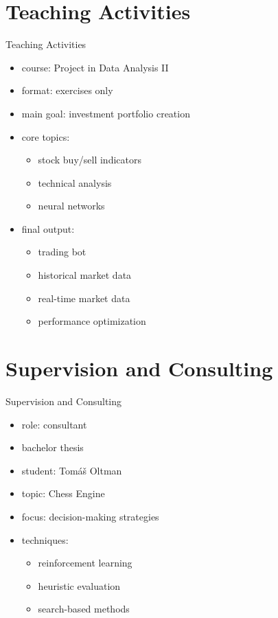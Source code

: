 \documentclass [xcolor=svgnames, t] {beamer}
\begin{document}
\section{Teaching Activities}
\begin{frame}{Teaching Activities}
\vspace{-0.6em}
\begin{itemize}
    \item course: Project in Data Analysis II
    \item format: exercises only
    \item main goal: investment portfolio creation
    \item core topics:
    \begin{itemize}
        \item stock buy/sell indicators
        \item technical analysis
        \item neural networks
    \end{itemize}
    \item final output:
    \begin{itemize}
        \item trading bot
        \item historical market data
        \item real-time market data
        \item performance optimization
    \end{itemize}
\end{itemize}
\end{frame}
\section{Supervision and Consulting}
\begin{frame}{Supervision and Consulting}
\vspace{-0.6em}
\begin{itemize}
    \item role: consultant
    \item bachelor thesis
    \item student: Tomáš Oltman
    \item topic: Chess Engine
    \item focus: decision-making strategies
    \item techniques:
    \begin{itemize}
        \item reinforcement learning
        \item heuristic evaluation
        \item search-based methods
    \end{itemize}
\end{itemize}

\end{frame}
\end{document}
